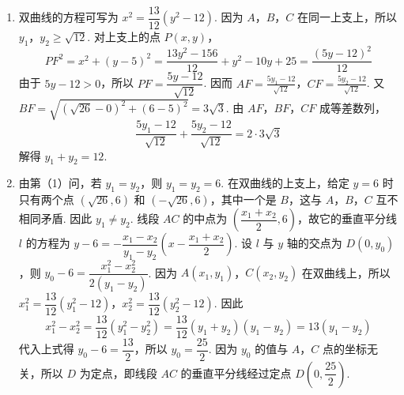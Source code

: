 \documentclass[UTF8,a4paper,oneside,11pt]{ctexbook}
\begin{document}
\begin{solution}
\begin{enumerate}
\item 双曲线的方程可写为 \(x^2=\dfrac{13}{12}(y^2-12)\). 因为 \(A\)，\(B\)，\(C\) 在同一上支上，所以 \(y_1\)，\(y_2\geqslant\sqrt{12}\). 对上支上的点 \(P(x,y)\)，
\[
PF^2=x^2+(y-5)^2=\frac{13y^2-156}{12}+y^2-10y+25=\frac{(5y-12)^2}{12}
\]
由于 \(5y-12>0\)，所以 \(PF=\dfrac{5y-12}{\sqrt{12}}\). 因而
\(AF=\frac{5y_1-12}{\sqrt{12}}\)，\(CF=\frac{5y_2-12}{\sqrt{12}}\).
又 \(BF=\sqrt{(\sqrt{26}-0)^2+(6-5)^2}=3\sqrt{3}\). 由 \(AF\)，\(BF\)，\(CF\) 成等差数列，
\[
\frac{5y_1-12}{\sqrt{12}}+\frac{5y_2-12}{\sqrt{12}}=2\cdot3\sqrt{3}
\]
解得 \(y_1+y_2=12\).

\item 由第（1）问，若 \(y_1=y_2\)，则 \(y_1=y_2=6\). 在双曲线的上支上，给定 \(y=6\) 时只有两个点 \((\sqrt{26},6)\) 和 \((-\sqrt{26},6)\)，其中一个是 \(B\)，这与 \(A\)，\(B\)，\(C\) 互不相同矛盾. 因此 \(y_1\ne y_2\). 线段 \(AC\) 的中点为 \(\left( \dfrac{x_1+x_2}{2},6 \right)\)，故它的垂直平分线 \(l\) 的方程为 \(y-6=-\dfrac{x_1-x_2}{y_1-y_2}\left( x-\dfrac{x_1+x_2}{2} \right)\). 设 \(l\) 与 \(y\) 轴的交点为 \(D(0,y_0)\)，则 \(y_0-6=\dfrac{x_1^2-x_2^2}{2(y_1-y_2)}\).
因为 \(A(x_1,y_1)\)，\(C(x_2,y_2)\) 在双曲线上，所以 \(x_1^2=\dfrac{13}{12}(y_1^2-12)\)，\(x_2^2=\dfrac{13}{12}(y_2^2-12)\). 因此
\[x_1^2-x_2^2=\frac{13}{12}(y_1^2-y_2^2)=\frac{13}{12}(y_1+y_2)(y_1-y_2)=13(y_1-y_2)\]
代入上式得 \(y_0-6=\dfrac{13}{2}\)，所以 \(y_0=\dfrac{25}{2}\).
因为 \(y_0\) 的值与 \(A\)，\(C\) 点的坐标无关，所以 \(D\) 为定点，即线段 \(AC\) 的垂直平分线经过定点 \(D\left( 0,\dfrac{25}{2} \right)\).
\end{enumerate}
\end{solution}

\end{document}
